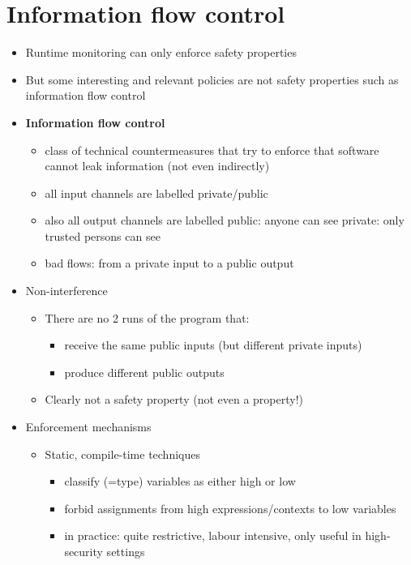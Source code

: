\documentclass[12pt,titlepage,a4paper]{report}
\begin{document}
	\section{Information flow control}
	\begin{itemize}
		\item Runtime monitoring can only enforce safety properties
		\item But some interesting and relevant policies are not safety properties
		\subitem such as information flow control
		\item \textbf{Information flow control}
		\begin{itemize}
			\item class of technical countermeasures that try to enforce that software cannot leak information (not even indirectly)
			\item all input channels are labelled private/public
			\item also all output channels are labelled
				\subitem public: anyone can see
				\subitem private: only trusted persons can see
			\item bad flows: from a private input to a public output
		\end{itemize}
		\item Non-interference
		\begin{itemize}
			\item There are no 2 runs of the program that:
			\begin{itemize}
				\item receive the same public inputs (but different private inputs)
				\item produce different public outputs
			\end{itemize}
			\item Clearly not a safety property (not even a property!)
		\end{itemize}
		\item Enforcement mechanisms
		\begin{itemize}
			\item Static, compile-time techniques
			\begin{itemize}
				\item classify (=type) variables as either high or low
				\item forbid assignments from high expressions/contexts to low variables
				\item in practice: quite restrictive, labour intensive, only useful in high-security settings
			\end{itemize}

\end{itemize}
\end{itemize}
\end{document}

